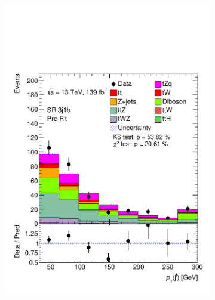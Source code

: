 \begin{figure}[!h]
\begin{subfigure}[b]{0.33\linewidth}
    \includegraphics[width=\linewidth]{ubonn-thesis/Chapters/Chapters_06/Figure/Input_distribution/SR_3j1b_forwardjet_pt.pdf} 
  \end{subfigure}%
  \begin{subfigure}[b]{0.33\linewidth}
    \centering

\end{subfigure}
\end{figure}
